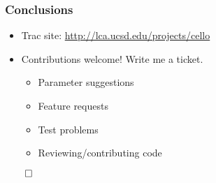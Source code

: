 \begin{frame}[fragile] 
   \frametitle{Conclusions}


\begin{itemize}
\item Trac site: \textcolor{blue}{\url{http://lca.ucsd.edu/projects/cello}}
\item Contributions welcome!  Write me a ticket.
\begin{itemize}
\item Parameter suggestions
\item Feature requests
\item Test problems
\item Reviewing/contributing code
\end{itemize}
\end{itemize}
\centerline{$\qed$}
\end{frame}
